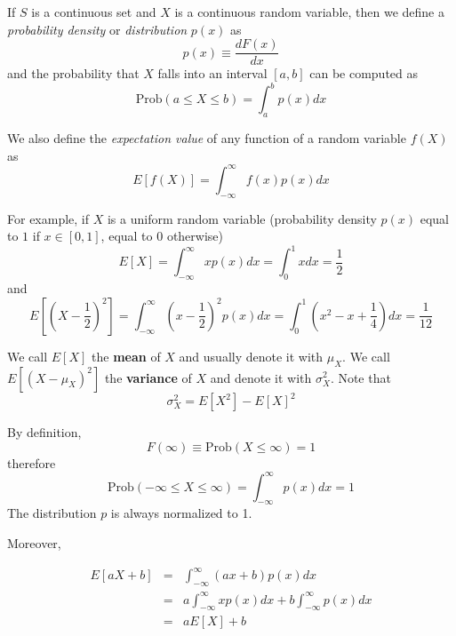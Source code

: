 \documentclass[justified, sixbynine]{tufte-book}
\theoremstyle{plain}%
\newtheorem * {corollary}{Corollary}
\theoremstyle{definition}
\theoremstyle{remark}
\newtheorem * {remark}{Remark}
\newtheorem * {note}{Note}
\begin{document}
\begin{fullwidth}
If $S$ is a continuous set and $X$ is a continuous random variable, then we
define a {\it probability density} or {\it distribution} $p(x)$ as
\begin{equation}
p(x)\equiv \frac{dF(x)}{dx}
\end{equation}
and the probability that $X$ falls into an interval $[a, b]$ can be computed
as
\begin{equation}
\textrm{Prob}(a\leq X\leq b)=\int_a^bp(x)dx
\end{equation}


We also define the {\it expectation value} of any function of a random
variable $f(X)$ as
\begin{equation}
E[f(X)]=\int_{-\infty }^\infty f(x)p(x)dx
\end{equation}

For example, if $X$ is a uniform random variable (probability density $p(x)$ equal to $1$ if
$x\in [0, 1]$, equal to $0$ otherwise)
\begin{equation}
E[X]=\int_{-\infty }^\infty xp(x)dx=\int_0^1xdx=\frac 12
\end{equation}
and
\begin{equation}
E[(X-\frac 12)^2]=\int_{-\infty }^\infty (x-\frac
12)^2p(x)dx=\int_0^1(x^2-x+\frac 14)dx=\frac 1{12}
\end{equation}

We call $E[X]$ the {\bf mean} of $X$ and usually denote it with $\mu _X$.
We call $E[(X-\mu _X)^2]$ the {\bf variance} of $X$ and denote it with $%
\sigma _X^2$. Note that
\begin{equation}
\sigma _X^2=E[X^2]-E[X]^2
\end{equation}

By definition, 
\begin{equation}
F(\infty )\equiv \textrm{Prob}(X\leq \infty )=1
\end{equation}
therefore
\begin{equation}
\textrm{Prob}(-\infty \leq X\leq \infty )=\int_{-\infty }^\infty p(x)dx=1
\end{equation}
The distribution $p$ is always normalized to 1.

Moreover, 

\begin{eqnarray}
E[aX+b] &=&\int_{-\infty }^\infty (ax+b)p(x)dx \\
&=&a\int_{-\infty }^\infty xp(x)dx+b\int_{-\infty }^\infty p(x)dx \\
&=&aE[X]+b
\end{eqnarray}


\end{fullwidth}
\end{document}

